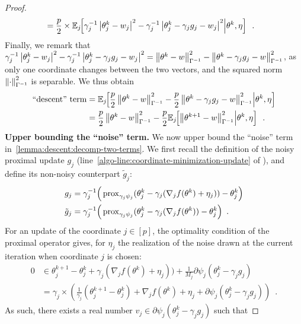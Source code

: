 \begin{proof}
\begin{align}
     & = \frac{p}{2} \times \mathbb E_{j} \hspace{-0.29em} \left[ \gamma_j^{-1} \left| \theta^k_j - w_j \right|^2 - \gamma_j^{-1} \left| \theta_j^k - \gamma_j g_j - w_j \right|^2 \middle\vert \theta^k, \eta \right]\enspace.
  \end{align}
  Finally, we remark that
  $\gamma_j^{-1} \left| \theta^k_j - w_j \right|^2 - \gamma_j^{-1} \left| \theta_j^k - \gamma_j g_j - w_j \right|^2
    = \left \lVert \theta^k - w \right \rVert_{\Gamma^{-1}}^2 - \left \lVert \theta^{k} - \gamma_j g_j - w \right \rVert_{\Gamma^{-1}}^2$,
  as only one coordinate changes between the two vectors, and the squared norm
  $\left \lVert \cdot \right \rVert_{\Gamma^{-1}}^2$ is separable.
  We thus obtain
  \begin{align}
    \text{``descent'' term}
     & = \mathbb E_{j} \hspace{-0.29em} \left[  \frac{p}{2} \left \lVert \theta^k - w \right \rVert_{\Gamma^{-1}}^2 - \frac{p}{2} \left \lVert \theta^{k} - \gamma_j g_j - w \right \rVert_{\Gamma^{-1}}^2 \middle\vert \theta^k, \eta \right] \\
     & = \frac{p}{2} \left \lVert \theta^k - w \right \rVert_{\Gamma^{-1}}^2 - \frac{p}{2} \mathbb E_{j} \hspace{-0.29em} \left[ \left \lVert \theta^{k+1} - w \right \rVert_{\Gamma^{-1}}^2 \middle\vert \theta^k, \eta \right]\enspace.
  \end{align}
  \textbf{Upper bounding the ``noise'' term.}
  We now upper bound the ``noise'' term in~\eqref{lemma:descent:decomp-two-terms}.
  We first recall the definition of the noisy proximal update $g_j$ (line~\ref{algo-line:coordinate-minimization-update} of ),
  and define its non-noisy counterpart $\tilde g_j$:
  \begin{align}
    g_j        & = \gamma_j^{-1} \Big(\operatorname{prox}_{\gamma_j \psi_j}(\theta^k_j - \gamma_j (\nabla_j f(\theta^k) + \eta_j)) - \theta^k_j\Big) \\
    \tilde g_j & = \gamma_j^{-1} \Big( \operatorname{prox}_{\gamma_j \psi_j}(\theta^k_j - \gamma_j (\nabla_j f(\theta^k)) - \theta^k_j\Big)\enspace.
  \end{align}
  For an update of the coordinate $j \in [p]$, the optimality condition of the
  proximal operator gives, for $\eta_j$ the realization of the noise drawn
  at the current iteration when coordinate $j$ is chosen:
  \begin{align}
    0
     & \in \theta^{k+1}_j - \theta^k_j + \gamma_j (\nabla_j f(\theta^k) + \eta_j)) + \frac{1}{M_j} \partial \psi_j(\theta_j^k - \gamma_j g_j) \\
     & = \gamma_j \times \left(
    \frac{1}{\gamma_j} (\theta^{k+1}_j - \theta^k_j) + \nabla_j f(\theta^k) + \eta_j + \partial \psi_j(\theta_j^k - \gamma_j g_j) \right)\enspace.
  \end{align}
  As such, there exists a real number
  $v_j \in \partial \psi_j(\theta^k_j - \gamma_j g_j)$ such that

\end{proof}
